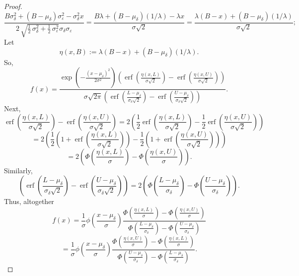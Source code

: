 \documentclass{article}
\newcommand{\ep}{\varepsilon}
\newcommand{\erf}{\operatorname{erf}}
\begin{document}
\begin{proof}
	$$\frac{B \sigma_{\delta}^{2} + {\left(B - \mu_{\delta}\right)} \sigma_{\ep}^{2} - \sigma_{\delta}^{2} x}{2 \, \sqrt{\frac{1}{2} \, \sigma_{\delta}^{2} + \frac{1}{2} \, \sigma_{\ep}^{2}} \sigma_{\delta} \sigma_{\ep}} = \frac{B\lambda + (B - \mu_\delta) (1 / \lambda) - \lambda x}{\sigma \sqrt{2}} = \frac{\lambda (B - x) + (B - \mu_\delta) (1 / \lambda)}{\sigma \sqrt{2}};$$
	Let
	$$\eta(x, B) := \lambda (B - x) + (B - \mu_\delta) (1 / \lambda).$$
	So,
	$$f(x) = \frac{\exp\left(-\frac{(x - \mu_\delta)^2}{2\sigma^2}\right) \left(\erf\left(\frac{\eta(x, L)}{\sigma \sqrt{2}}\right) - \erf\left(\frac{\eta(x, U)}{\sigma \sqrt{2}}\right)\right)}{\sigma\sqrt{2\pi}\left(\erf\left(\frac{L - \mu_\delta}{\sigma_\delta\sqrt{2}}\right) - \erf\left(\frac{U - \mu_\delta}{\sigma_\delta\sqrt{2}}\right)\right)}.$$
	Next,
	$$\erf\left(\frac{\eta(x, L)}{\sigma \sqrt{2}}\right) - \erf\left(\frac{\eta(x, U)}{\sigma \sqrt{2}}\right) = 2\left(\frac12 \erf\left(\frac{\eta(x, L)}{\sigma \sqrt{2}}\right) - \frac12\erf\left(\frac{\eta(x, U)}{\sigma \sqrt{2}}\right)\right)$$
	$$= 2\left(\frac12 \left(1 + \erf\left(\frac{\eta(x, L)}{\sigma \sqrt{2}}\right)\right) - \frac12 \left(1 + \erf\left(\frac{\eta(x, U)}{\sigma \sqrt{2}}\right)\right)\right)$$
	$$= 2\left(\Phi\left(\frac{\eta(x, L)}{\sigma}\right) - \Phi\left(\frac{\eta(x, U)}{\sigma}\right)\right).$$
	Similarly,
	$$\left(\erf\left(\frac{L - \mu_\delta}{\sigma_\delta\sqrt{2}}\right) - \erf\left(\frac{U - \mu_\delta}{\sigma_\delta\sqrt{2}}\right)\right) = 2\left(\Phi\left(\frac{L - \mu_\delta}{\sigma_\delta}\right) - \Phi\left(\frac{U - \mu_\delta}{\sigma_\delta}\right)\right).$$
	Thus, altogether
	$$f(x) = \frac{1}{\sigma}\phi\left(\frac{x - \mu_\delta}{\sigma}\right) \frac{\Phi\left(\frac{\eta(x, L)}{\sigma}\right) - \Phi\left(\frac{\eta(x, U)}{\sigma}\right)}{\Phi\left(\frac{L - \mu_\delta}{\sigma_\delta}\right) - \Phi\left(\frac{U - \mu_\delta}{\sigma_\delta}\right)}$$
	$$= \frac{1}{\sigma}\phi\left(\frac{x - \mu_\delta}{\sigma}\right) \frac{\Phi\left(\frac{\eta(x, U)}{\sigma}\right) - \Phi\left(\frac{\eta(x, L)}{\sigma}\right)}{\Phi\left(\frac{U - \mu_\delta}{\sigma_\delta}\right) - \Phi\left(\frac{L - \mu_\delta}{\sigma_\delta}\right)}.$$
\end{proof}
\end{document}

